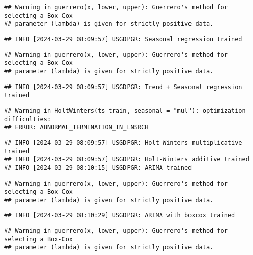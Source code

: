 \documentclass[
]{article}
\begin{document}
\begin{verbatim}
## Warning in guerrero(x, lower, upper): Guerrero's method for selecting a Box-Cox
## parameter (lambda) is given for strictly positive data.
\end{verbatim}

\begin{verbatim}
## INFO [2024-03-29 08:09:57] USGDPGR: Seasonal regression trained
\end{verbatim}

\begin{verbatim}
## Warning in guerrero(x, lower, upper): Guerrero's method for selecting a Box-Cox
## parameter (lambda) is given for strictly positive data.
\end{verbatim}

\begin{verbatim}
## INFO [2024-03-29 08:09:57] USGDPGR: Trend + Seasonal regression trained
\end{verbatim}

\begin{verbatim}
## Warning in HoltWinters(ts_train, seasonal = "mul"): optimization difficulties:
## ERROR: ABNORMAL_TERMINATION_IN_LNSRCH
\end{verbatim}

\begin{verbatim}
## INFO [2024-03-29 08:09:57] USGDPGR: Holt-Winters multiplicative trained
## INFO [2024-03-29 08:09:57] USGDPGR: Holt-Winters additive trained
## INFO [2024-03-29 08:10:15] USGDPGR: ARIMA trained
\end{verbatim}

\begin{verbatim}
## Warning in guerrero(x, lower, upper): Guerrero's method for selecting a Box-Cox
## parameter (lambda) is given for strictly positive data.
\end{verbatim}

\begin{verbatim}
## INFO [2024-03-29 08:10:29] USGDPGR: ARIMA with boxcox trained
\end{verbatim}

\begin{verbatim}
## Warning in guerrero(x, lower, upper): Guerrero's method for selecting a Box-Cox
## parameter (lambda) is given for strictly positive data.
\end{verbatim}
\end{document}
